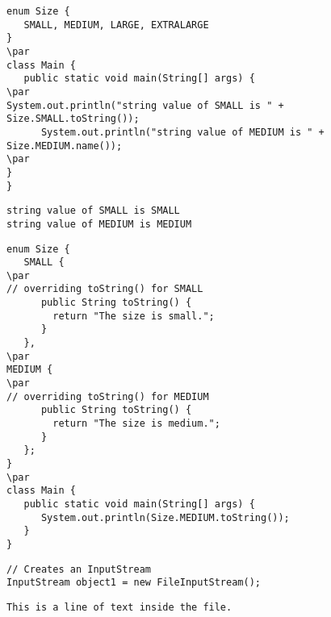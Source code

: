 \documentclass{book}
\def\lthtmlcheckvsize{\ifdim\ht\sizebox<\vsize 
  \ifdim\wd\sizebox<\hsize\expandafter\hfill\fi \expandafter\vfill
  \else\expandafter\vss\fi}%
\begin{document}
{\newpage\clearpage
{}%
\begin{lstlisting}
enum Size {
   SMALL, MEDIUM, LARGE, EXTRALARGE
}
\par
class Main {
   public static void main(String[] args) {
\par
System.out.println("string value of SMALL is " + Size.SMALL.toString());
      System.out.println("string value of MEDIUM is " + Size.MEDIUM.name());
\par
}
}
\end{lstlisting}%
\lthtmlfigureZ
\lthtmlcheckvsize\clearpage}

{\newpage\clearpage
{}%
\begin{lstlisting}
string value of SMALL is SMALL
string value of MEDIUM is MEDIUM
\end{lstlisting}%
\lthtmlfigureZ
\lthtmlcheckvsize\clearpage}

{\newpage\clearpage
{}%
\begin{lstlisting}
enum Size {
   SMALL {
\par
// overriding toString() for SMALL
      public String toString() {
        return "The size is small.";
      }
   },
\par
MEDIUM {
\par
// overriding toString() for MEDIUM
      public String toString() {
        return "The size is medium.";
      }
   };
}
\par
class Main {
   public static void main(String[] args) {
      System.out.println(Size.MEDIUM.toString());
   }
}
\end{lstlisting}%
\lthtmlfigureZ
\lthtmlcheckvsize\clearpage}

{\newpage\clearpage
{}%
\begin{lstlisting}
// Creates an InputStream
InputStream object1 = new FileInputStream();
\end{lstlisting}%
\lthtmlfigureZ
\lthtmlcheckvsize\clearpage}

{\newpage\clearpage
{}%
\begin{lstlisting}
This is a line of text inside the file.
\end{lstlisting}%
\lthtmlfigureZ
\lthtmlcheckvsize\clearpage}
\end{document}

